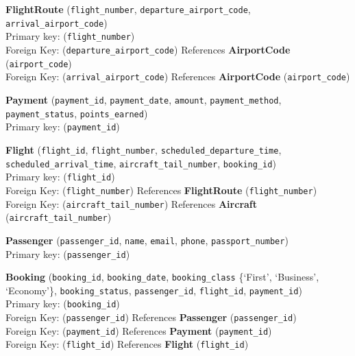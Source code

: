\documentclass[12pt]{article}
\begin{document}
\vspace{0.3cm}

\noindent\textbf{FlightRoute} (\texttt{flight\_number}, \texttt{departure\_airport\_code}, \texttt{arrival\_airport\_code}) \\
Primary key: (\texttt{flight\_number}) \\
Foreign Key: (\texttt{departure\_airport\_code}) References \textbf{AirportCode} (\texttt{airport\_code}) \\
Foreign Key: (\texttt{arrival\_airport\_code}) References \textbf{AirportCode} (\texttt{airport\_code})

\vspace{0.3cm}

\noindent\textbf{Payment} (\texttt{payment\_id}, \texttt{payment\_date}, \texttt{amount}, \texttt{payment\_method}, \texttt{payment\_status}, \texttt{points\_earned}) \\
Primary key: (\texttt{payment\_id})

\vspace{0.3cm}

\noindent\textbf{Flight} (\texttt{flight\_id}, \texttt{flight\_number}, \texttt{scheduled\_departure\_time}, \texttt{scheduled\_arrival\_time}, \texttt{aircraft\_tail\_number}, \texttt{booking\_id}) \\
Primary key: (\texttt{flight\_id}) \\
Foreign Key: (\texttt{flight\_number}) References \textbf{FlightRoute} (\texttt{flight\_number}) \\
Foreign Key: (\texttt{aircraft\_tail\_number}) References \textbf{Aircraft} (\texttt{aircraft\_tail\_number})

\vspace{0.3cm}

\noindent\textbf{Passenger} (\texttt{passenger\_id}, \texttt{name}, \texttt{email}, \texttt{phone}, \texttt{passport\_number}) \\
Primary key: (\texttt{passenger\_id})

\vspace{0.3cm}

\noindent\textbf{Booking} (\texttt{booking\_id}, \texttt{booking\_date}, \texttt{booking\_class} \{`First', `Business', `Economy'\}, \texttt{booking\_status}, \texttt{passenger\_id}, \texttt{flight\_id}, \texttt{payment\_id}) \\
Primary key: (\texttt{booking\_id}) \\
Foreign Key: (\texttt{passenger\_id}) References \textbf{Passenger} (\texttt{passenger\_id}) \\
Foreign Key: (\texttt{payment\_id}) References \textbf{Payment} (\texttt{payment\_id}) \\
Foreign Key: (\texttt{flight\_id}) References \textbf{Flight} (\texttt{flight\_id})
\end{document}
